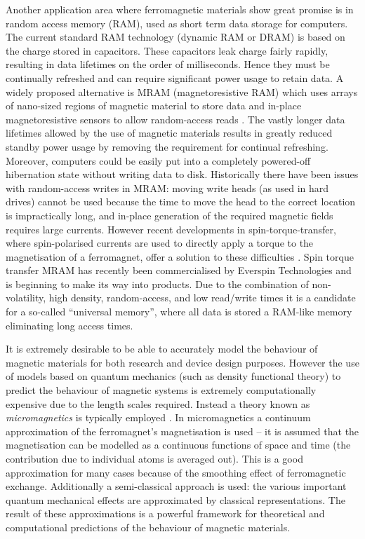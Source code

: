 Another application area where ferromagnetic materials show great promise is in random access memory (RAM), used as short term data storage for computers.
The current standard RAM technology (dynamic RAM or DRAM) is based on the charge stored in capacitors.
These capacitors leak charge fairly rapidly, resulting in data lifetimes on the order of milliseconds.
Hence they must be continually refreshed and can require significant power usage to retain data.
A widely proposed alternative is MRAM (magnetoresistive RAM) which uses arrays of nano-sized regions of magnetic material to store data and in-place magnetoresistive sensors to allow random-access reads \cite[Sec. 14.4]{Kronmuller1997}.
The vastly longer data lifetimes allowed by the use of magnetic materials results in greatly reduced standby power usage by removing the requirement for continual refreshing.
Moreover, computers could be easily put into a completely powered-off hibernation state without writing data to disk.
Historically there have been issues with random-access writes in MRAM: moving write heads (as used in hard drives) cannot be used because the time to move the head to the correct location is impractically long, and in-place generation of the required magnetic fields requires large currents.
However recent developments in spin-torque-transfer, where spin-polarised currents are used to directly apply a torque to the magnetisation of a ferromagnet, offer a solution to these difficulties \cite{Apalkov2013}.
Spin torque transfer MRAM has recently been commercialised by Everspin Technologies \cite{everspin} and is beginning to make its way into products.
Due to the combination of non-volatility, high density, random-access, and low read/write times it is a candidate for a so-called ``universal memory'', where all data is stored a RAM-like memory eliminating long access times.


It is extremely desirable to be able to accurately model the behaviour of magnetic materials for both research and device design purposes.
However the use of models based on quantum mechanics (such as density functional theory) to predict the behaviour of magnetic systems is extremely computationally expensive due to the length scales required.
Instead a theory known as \emph{micromagnetics} is typically employed \cite{Aharoni1996}.
In micromagnetics a continuum approximation of the ferromagnet's magnetisation is used -- it is  assumed that the magnetisation can be modelled as a continuous functions of space and time (\ie the contribution due to individual atoms is averaged out).
This is a good approximation for many cases because of the smoothing effect of ferromagnetic exchange.
Additionally a semi-classical approach is used: the various important quantum mechanical effects are approximated by classical representations.
The result of these approximations is a powerful framework for theoretical and computational predictions of the behaviour of magnetic materials.

